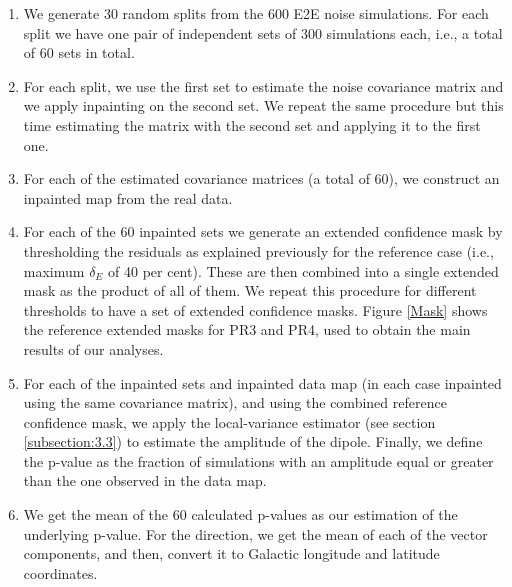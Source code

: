 \begin{enumerate}
    \item We generate 30 random splits from the 600 E2E noise simulations. For each split we have one pair of independent sets of 300 simulations each, i.e., a total of 60 sets in total.
    \item For each split, we use the first set
    to estimate the noise covariance matrix and we apply inpainting on the second set.
    We repeat the same procedure but this time estimating the matrix with the second set and applying it to the first one.
    \item For each of the estimated covariance matrices (a total of 60), we construct an inpainted map from the real data.
    \item For each of the 60 inpainted sets we generate an extended confidence mask by thresholding the residuals as explained previously for the reference case (i.e., maximum $\delta_E$ of 40 per cent). These are then combined into a single extended mask as the product of all of them. We repeat this procedure for different thresholds to have a set of extended confidence masks. Figure \ref{Mask} shows the reference extended masks for PR3 and PR4, used to obtain the main results of our analyses. 
    \item For each of the inpainted sets and inpainted data map (in each case inpainted using the same covariance matrix), and using the combined reference confidence mask, we apply the local-variance estimator (see section \ref{subsection:3.3}) to estimate the amplitude of the dipole. Finally, we define the p-value as the fraction of simulations with an amplitude equal or greater than the one observed in the data map.
    \item We get the mean of the 60 calculated p-values as our estimation of the underlying p-value. For the direction, we get the mean of 
    each of the vector components, and then, convert it to Galactic longitude and latitude coordinates.
\end{enumerate}

